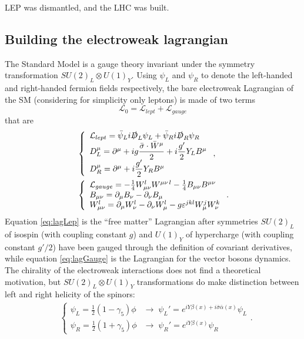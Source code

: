 LEP was dismantled, and the LHC was built.



\subsection{Building the electroweak lagrangian}\label{sec:ewlagr}
The Standard Model is a gauge theory invariant under the symmetry transformation $SU(2)_{L} \otimes U(1)_{Y}$. Using $\psi_{L}$ and $\psi_{R}$ to denote the left-handed and right-handed fermion fields respectively, the bare electroweak Lagrangian of the SM (considering for simplicity only leptons) is made of two terms\begin{equation}\label{eq:bareLagSM}
\mathcal{L}_{0} = \mathcal{L}_{lept}+ \mathcal{L}_{gauge}
\end{equation}that are \begin{align}
&\left \{ \begin{array}{ll}
\mathcal{L}_{lept} = \bar\psi_{L}i\slashed{D}_{L}\psi_{L} + \bar\psi_{R}i\slashed{D}_{R}\psi_{R}\\
D_{L}^{\mu} = \partial^{\mu} + ig\dfrac{\bar{\sigma}\cdot\bar{W}^{\mu}}{2} + i\dfrac{g'}{2}Y_{L}B^{\mu}\\
D_{R}^{\mu} = \partial^{\mu} + i\dfrac{g'}{2}Y_{R}B^{\mu}
\end{array} \right. ,\label{eq:lagLep} \\
&\left \{ \begin{array}{ll}
\mathcal{L}_{gauge}  = -\frac{1}{4}W_{\mu\nu}^{l}W^{\mu\nu\, l}  -\frac{1}{4}B_{\mu\nu}B^{\mu\nu}\\
B_{\mu\nu} = \partial_{\mu}B_{\nu} - \partial_{\nu}B_{\mu}\\
W_{\mu\nu}^{l} = \partial_{\mu}W_{\nu}^{l} - \partial_{\nu}W_{\mu}^{l} - g\varepsilon^{jkl}W_{\mu}^{j}W_{\nu}^{k}
\end{array} \right. .\label{eq:lagGauge}
\end{align}
Equation \ref{eq:lagLep} is the ``free matter'' Lagrangian after symmetries $SU(2)_{L}$ of isospin (with coupling constant $g$) and $U(1)_{Y}$ of hypercharge (with coupling constant $g'/2$) have been gauged through the definition of covariant derivatives, while equation \ref{eq:lagGauge} is the Lagrangian for the vector bosons dynamics. The chirality of the electroweak interactions does not find a theoretical motivation, but $SU(2)_{L} \otimes U(1)_{Y}$ transformations do make distinction between left and right helicity of the spinors:\begin{align}
&\left \{ \begin{array}{ll}
\psi_{L} = \frac{1}{2}(1 - \gamma_{5})\phi &\rightarrow \; \psi_{L}' = e^{iY\beta(x) + i\bar{\sigma}\bar{\alpha}(x)}\psi_{L} \\
\psi_{R} = \frac{1}{2}(1 + \gamma_{5})\phi &\rightarrow \; \psi_{R}' = e^{iY\beta(x)}\psi_{R}
\end{array} \right. .
\label{eq:chiral}
\end{align}

